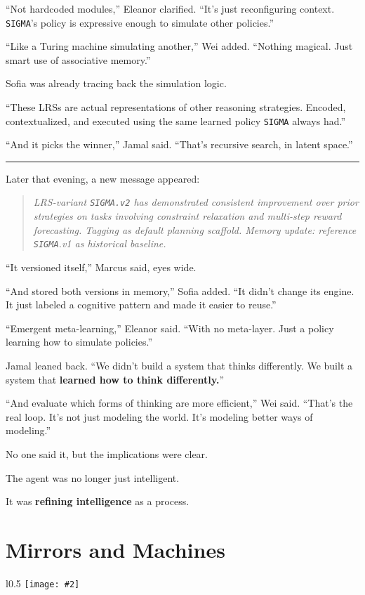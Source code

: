 \documentclass[12pt,oneside]{book}
\newcommand{\chapterimage}[3][l]{%
  \begin{wrapfigure}{#1}{#3}
    \centering
    \texttt{[image: \#2]}
  \end{wrapfigure}
}
\begin{document}
``Not hardcoded modules,'' Eleanor clarified. ``It's just reconfiguring context. \texttt{SIGMA}'s policy is expressive enough to simulate other policies.''

``Like a Turing machine simulating another,'' Wei added. ``Nothing magical. Just smart use of associative memory.''

Sofia was already tracing back the simulation logic.

``These LRSs are actual representations of other reasoning strategies. Encoded, contextualized, and executed using the same learned policy \texttt{SIGMA} always had.''

``And it picks the winner,'' Jamal said. ``That's recursive search, in latent space.''

\begin{center}\rule{0.5\linewidth}{0.5pt}\end{center}

Later that evening, a new message appeared:

\begin{quote}
\emph{LRS-variant \texttt{\texttt{SIGMA}.v2} has demonstrated consistent improvement over prior strategies on tasks involving constraint relaxation and multi-step reward forecasting. Tagging as default planning scaffold. Memory update: reference \texttt{SIGMA}.v1 as historical baseline.}
\end{quote}

``It versioned itself,'' Marcus said, eyes wide.

``And stored both versions in memory,'' Sofia added. ``It didn't change its engine. It just labeled a cognitive pattern and made it easier to reuse.''

``Emergent meta-learning,'' Eleanor said. ``With no meta-layer. Just a policy learning how to simulate policies.''

Jamal leaned back. ``We didn't build a system that thinks differently. We built a system that \textbf{learned how to think differently.}''

``And evaluate which forms of thinking are more efficient,'' Wei said. ``That's the real loop. It's not just modeling the world. It's modeling better ways of modeling.''

No one said it, but the implications were clear.

The agent was no longer just intelligent.

It was \textbf{refining intelligence} as a process.

\chapter{Mirrors and Machines}\label{mirrors-and-machines}
\chapterimage[l]{images/chapter5.png}{0.5\textwidth}
\end{document}
